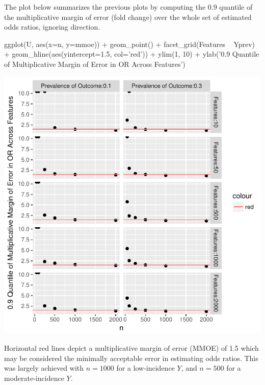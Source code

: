 The plot below summarizes the previous plots by computing the 0.9 quantile of
the multiplicative margin of error (fold change) over the whole set of estimated
odds ratios, ignoring direction. 
\begin{Schunk}
\begin{Sinput}
ggplot(U, aes(x=n, y=mmoe)) + geom_point() + facet_grid(Features ~ Yprev) +
  geom_hline(aes(yintercept=1.5, col='red')) +
  ylim(1, 10) +
  ylab('0.9 Quantile of Multiplicative Margin of Error in OR Across Features')
\end{Sinput}


\centerline{\includegraphics{hdata-simor-mmoe-1} }

\end{Schunk}
Horizontal red lines depict a multiplicative margin of error (MMOE) of
1.5 which may be considered the minimally acceptable error in
estimating odds ratios.  This was largely achieved with $n=1000$ for a
low-incidence $Y$, and $n=500$ for a moderate-incidence $Y$.

